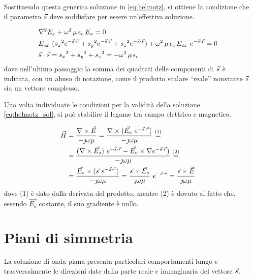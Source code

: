 	Sostituendo questa generica soluzione in \ref{eq:helmotz}, si ottiene la condizione che il parametro $\vec{s}$ deve soddisfare per essere un'effettiva soluzione.

	\begin{equation} \label{eq:condizione_s}
		\begin{split}
			& \nabla^2 E_x+ \omega^2 \, \mu \, \epsilon_c \, E_x = 0 \\
			& E_{ox} ~ ({s_x}^2 e^{-\vec{s} \cdot \vec{r}} +
				{s_y}^2 e^{-\vec{s} \cdot \vec{r}} +
				{s_z}^2 e^{-\vec{s} \cdot \vec{r}}) +
				\omega^2 \, \mu \, \epsilon_c \, E_{ox} ~ e^{-\vec{s} \cdot \vec{r}} = 0 \\
			& \vec{s} \cdot \vec{s} = {s_x}^2 + {s_y}^2 + {s_z}^2 = - \omega^2 \, \mu \, \epsilon_c
		\end{split}
	\end{equation}
	dove nell'ultimo passaggio la somma dei quadrati delle componenti di $\vec{s}$ è indicata, con un abuso di notazione, come il prodotto scalare ``reale'' nonstante $\vec{s}$ sia un vettore complesso.

	Una volta individuate le condizioni per la validità della soluzione \ref{eq:helmotz_sol}, si può stabilire il legame tra campo elettrico e magnetico.

	\begin{equation*}
		\begin{split}
			\vec{H} & = \frac {\nabla\times\vec{E}}{- \jmath \omega \mu} =
				\frac {\nabla\times(\vec{E_o} ~ e^{-\vec{s} \cdot \vec{r}})}{- \jmath \omega \mu} \stackrel{(1)}{=} \\
			& = \frac {(\nabla\times\vec{E_o}) ~ e^{-\vec{s} \cdot \vec{r}} - \vec{E_o} \times \nabla e^{-\vec{s} \cdot \vec{r}})} {- \jmath \omega \mu} \stackrel{(2)}{=} \\
			& = \frac { \vec{E_o} \times ( \vec{s} ~ e^{-\vec{s} \cdot \vec{r}})} {- \jmath \omega \mu} = \frac { \vec{s} \times \vec{E_o}} {\jmath \omega \mu} ~ e^{-\vec{s} \cdot \vec{r}} = \frac { \vec{s} \times \vec{E}} {\jmath \omega \mu} \\
		\end{split}
	\end{equation*}
	dove (1) è dato dalla derivata del prodotto, mentre (2) è dovuto al fatto che, essendo $\vec{E_o}$ costante, il suo gradiente è nullo.

\section{Piani di simmetria}
	La soluzione di onda piana presenta particolari comportamenti lungo e trasversalmente le direzioni date dalla parte reale e immaginaria del vettore $\vec{s}$.

